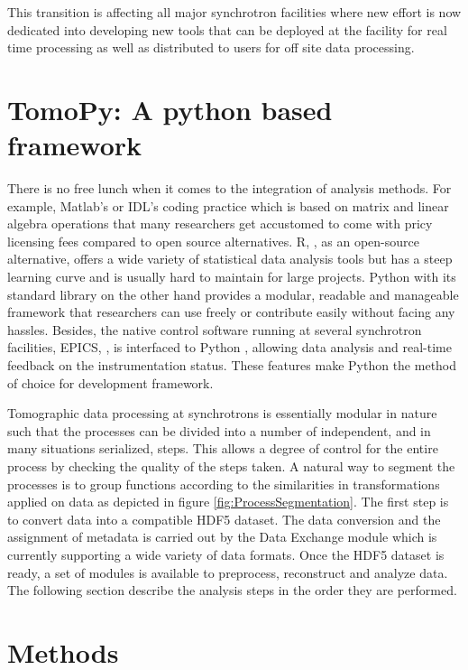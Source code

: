 \documentclass[pdf]{iucr}              %
\begin{document}
This transition is affecting all major synchrotron facilities where new effort is now dedicated into developing new tools that can be deployed at the facility for real time processing as well as distributed to users for off site data processing.


\section{TomoPy: A python based framework}

There is no free lunch when it comes to the integration of analysis methods. For example, Matlab's or IDL's coding practice which is based on matrix and linear algebra operations that many researchers get accustomed to come with pricy licensing fees compared to open source alternatives. R, \cite{r}, as an open-source alternative, offers a wide variety of statistical data analysis tools but has a steep learning curve and is usually hard to maintain for large projects. Python with its standard library on the other hand provides a modular, readable and manageable framework that researchers can use freely or contribute easily without facing any hassles. Besides, the native  control software running at several synchrotron facilities, EPICS, \cite{epics}, is interfaced to Python \cite{pyepics}, allowing data analysis and real-time feedback on the instrumentation status. These features make Python the method of choice for development framework.

Tomographic data processing at synchrotrons is essentially modular in nature such that the processes can be divided into a number of independent, and in many situations serialized, steps. This allows a degree of control for the entire process by checking the quality of the steps taken. A natural way to segment the processes is to group functions according to the similarities in transformations applied on data as depicted in figure \ref{fig:ProcessSegmentation}. The first step is to convert data into a compatible HDF5 dataset. The data conversion and the assignment of metadata is carried out by the Data Exchange module which is currently supporting a wide variety of data formats. Once the HDF5 dataset is ready, a set of modules is available to preprocess, reconstruct and analyze data. The following section  describe the analysis steps in the order they are performed.

\section{Methods} 
\end{document}
